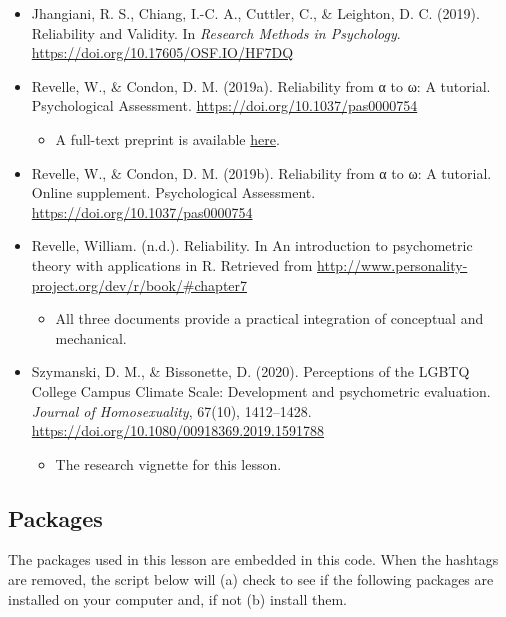 \documentclass[
  english,
]{book}
\providecommand{\tightlist}{%
  \setlength{\itemsep}{0pt}\setlength{\parskip}{0pt}}
\begin{document}
\begin{itemize}
\tightlist
\item
  Jhangiani, R. S., Chiang, I.-C. A., Cuttler, C., \& Leighton, D. C. (2019). Reliability and Validity. In \emph{Research Methods in Psychology}. \url{https://doi.org/10.17605/OSF.IO/HF7DQ}
\item
  Revelle, W., \& Condon, D. M. (2019a). Reliability from α to ω: A tutorial. Psychological Assessment. \url{https://doi.org/10.1037/pas0000754}

  \begin{itemize}
  \tightlist
  \item
    A full-text preprint is available \href{https://personality-project.org/revelle/publications/rc.pa.19.pdf}{here}.
  \end{itemize}
\item
  Revelle, W., \& Condon, D. M. (2019b). Reliability from α to ω: A tutorial. Online supplement. Psychological Assessment. \url{https://doi.org/10.1037/pas0000754}
\item
  Revelle, William. (n.d.). Reliability. In An introduction to psychometric theory with applications in R. Retrieved from \url{http://www.personality-project.org/dev/r/book/\#chapter7}

  \begin{itemize}
  \tightlist
  \item
    All three documents provide a practical integration of conceptual and mechanical.
  \end{itemize}
\item
  Szymanski, D. M., \& Bissonette, D. (2020). Perceptions of the LGBTQ College Campus Climate Scale: Development and psychometric evaluation. \emph{Journal of Homosexuality}, 67(10), 1412--1428. \url{https://doi.org/10.1080/00918369.2019.1591788}

  \begin{itemize}
  \tightlist
  \item
    The research vignette for this lesson.
  \end{itemize}
\end{itemize}

\hypertarget{packages-3}{%
\subsection{Packages}\label{packages-3}}

The packages used in this lesson are embedded in this code. When the hashtags are removed, the script below will (a) check to see if the following packages are installed on your computer and, if not (b) install them.
\end{document}
